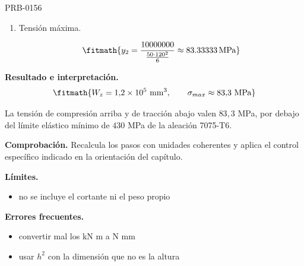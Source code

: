 \begin{studiumworked}{PRB-0156}
\begin{enumerate}
\item Tensión máxima.

\[\fitmath{y_{2}=\frac{10000000}{\frac{50\cdot {120}^{2}}{6}}\approx 83.33333\,\mathrm{MPa}}\]

\end{enumerate}

\textbf{Resultado e interpretación.}\[\fitmath{W_z = 1{,}2\times 10^{5}\ \mathrm{mm}^{3},\qquad \sigma_{max} \approx 83{,}3\ \mathrm{MPa}}\]

La tensión de compresión arriba y de tracción abajo valen $83{,}3$ MPa, por debajo del límite elástico mínimo de $430$ MPa de la aleación 7075-T6.

\par\textbf{Comprobación.} Recalcula los pasos con unidades coherentes y aplica el control específico indicado en la orientación del capítulo.

\textbf{Límites.}\begin{itemize}\item no se incluye el cortante ni el peso propio\end{itemize}

\textbf{Errores frecuentes.}\begin{itemize}\item convertir mal los kN m a N mm
\item usar $h^2$ con la dimensión que no es la altura\end{itemize}

\end{studiumworked}

\Needspace{.3\textheight}

